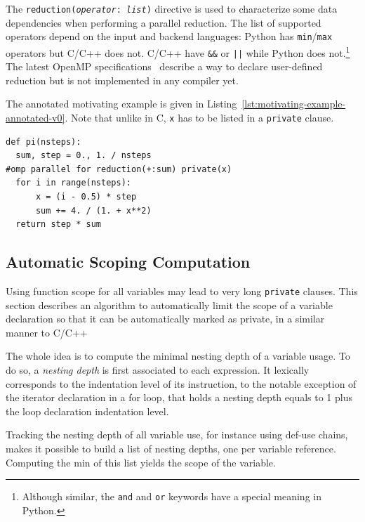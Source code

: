 \documentclass[conference]{IEEEtran}
\begin{document}
The \texttt{reduction(\emph{operator}: \emph{list})} directive is used to
characterize some data dependencies when performing a parallel reduction. The
list of supported operators depend on the input and backend languages: Python
has \texttt{min}/\texttt{max} operators but C/C++ does not. %
C/C++ have
\texttt{\&\&} or \texttt{||} while Python does not.\footnote{Although similar,
the \texttt{and} and \texttt{or} keywords have a special meaning in Python.}
The latest OpenMP specifications~\cite{openmp4} describe a way to declare
user-defined reduction but is not implemented in any compiler yet.

The annotated motivating example is given in
Listing~\ref{lst:motivating-example-annotated-v0}. Note that unlike in C,
\texttt{x} has to be listed in a \texttt{private} clause.

\begin{lstlisting}[float, label={lst:motivating-example-annotated-v0},
  caption={Motivating example: computing $\pi$ in Python with OpenMP.}]
def pi(nsteps):
  sum, step = 0., 1. / nsteps
#omp parallel for reduction(+:sum) private(x)
  for i in range(nsteps):
      x = (i - 0.5) * step
      sum += 4. / (1. + x**2)
  return step * sum
\end{lstlisting}

\subsection{Automatic Scoping Computation}

Using function scope for all variables may lead to very long \texttt{private}
clauses. This section describes an algorithm to automatically limit the scope of
a variable declaration so that it can be automatically marked as private, in
a similar manner to C/C++

The whole idea is to compute the minimal nesting depth of a variable usage. To
do so, a \emph{nesting depth} is first associated to each expression. It
lexically corresponds to the indentation level of its instruction, to the
notable exception of the iterator declaration in a for loop, that holds a
nesting depth equals to 1 plus the loop declaration indentation level.

Tracking the nesting depth of all variable use, for instance using def-use %
chains, makes it possible to build a list of nesting depths, one per variable
reference. Computing the min of this list yields the scope of the variable.
\end{document}
